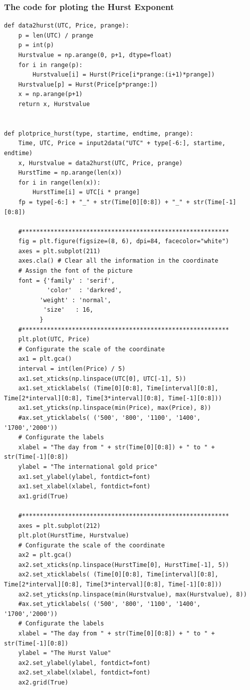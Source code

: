 \documentclass[12pt]{article}
\begin{document}
\subsubsection{The code for ploting the Hurst Exponent}
\begin{lstlisting}
def data2hurst(UTC, Price, prange):
    p = len(UTC) / prange
    p = int(p)
    Hurstvalue = np.arange(0, p+1, dtype=float)
    for i in range(p):
        Hurstvalue[i] = Hurst(Price[i*prange:(i+1)*prange])
    Hurstvalue[p] = Hurst(Price[p*prange:])
    x = np.arange(p+1)
    return x, Hurstvalue


def plotprice_hurst(type, startime, endtime, prange):
    Time, UTC, Price = input2data("UTC" + type[-6:], startime, endtime)
    x, Hurstvalue = data2hurst(UTC, Price, prange)
    HurstTime = np.arange(len(x))
    for i in range(len(x)):
        HurstTime[i] = UTC[i * prange]
    fp = type[-6:] + "_" + str(Time[0][0:8]) + "_" + str(Time[-1][0:8])

    #**********************************************************
    fig = plt.figure(figsize=(8, 6), dpi=84, facecolor="white")
    axes = plt.subplot(211)
    axes.cla() # Clear all the information in the coordinate
    # Assign the font of the picture
    font = {'family' : 'serif',
            'color'  : 'darkred',
          'weight' : 'normal',
           'size'   : 16,
          }
    #**********************************************************
    plt.plot(UTC, Price)
    # Configurate the scale of the coordinate
    ax1 = plt.gca()
    interval = int(len(Price) / 5)
    ax1.set_xticks(np.linspace(UTC[0], UTC[-1], 5))
    ax1.set_xticklabels( (Time[0][0:8], Time[interval][0:8], Time[2*interval][0:8], Time[3*interval][0:8], Time[-1][0:8]))
    ax1.set_yticks(np.linspace(min(Price), max(Price), 8))
    #ax.set_yticklabels( ('500', '800', '1100', '1400', '1700','2000'))
    # Configurate the labels
    xlabel = "The day from " + str(Time[0][0:8]) + " to " + str(Time[-1][0:8])
    ylabel = "The international gold price"
    ax1.set_ylabel(ylabel, fontdict=font)
    ax1.set_xlabel(xlabel, fontdict=font)
    ax1.grid(True)

    #**********************************************************
    axes = plt.subplot(212)
    plt.plot(HurstTime, Hurstvalue)
    # Configurate the scale of the coordinate
    ax2 = plt.gca()
    ax2.set_xticks(np.linspace(HurstTime[0], HurstTime[-1], 5))
    ax2.set_xticklabels( (Time[0][0:8], Time[interval][0:8], Time[2*interval][0:8], Time[3*interval][0:8], Time[-1][0:8]))
    ax2.set_yticks(np.linspace(min(Hurstvalue), max(Hurstvalue), 8))
    #ax.set_yticklabels( ('500', '800', '1100', '1400', '1700','2000'))
    # Configurate the labels
    xlabel = "The day from " + str(Time[0][0:8]) + " to " + str(Time[-1][0:8])
    ylabel = "The Hurst Value"
    ax2.set_ylabel(ylabel, fontdict=font)
    ax2.set_xlabel(xlabel, fontdict=font)
    ax2.grid(True)


\end{lstlisting}
\end{document}
